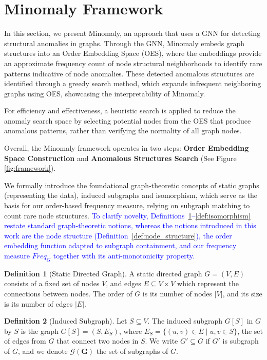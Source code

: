 \documentclass[preprint,12pt]{elsarticle}
\newcommand{\new}[1]{\textcolor{blue}{#1}}
\theoremstyle{plain}
\theoremstyle{definition}
\newtheorem{definition}{Definition}
\theoremstyle{remark}
\begin{document}
\section{Minomaly Framework}
\label{sec:framework}
In this section, we present Minomaly, an approach that uses a GNN for detecting structural anomalies in graphs. Through the GNN, Minomaly embeds graph structures into an Order Embedding Space (OES), where the embeddings provide an approximate frequency count of node structural neighborhoods to identify rare patterns indicative of node anomalies. These detected anomalous structures are identified through a greedy search method, which expands infrequent neighboring graphs using OES, showcasing the interpretability of Minomaly.

For efficiency and effectiveness, a heuristic search is applied to reduce the anomaly search space by selecting potential nodes from the OES that produce anomalous patterns, rather than verifying the normality of all graph nodes.

Overall, the Minomaly framework operates in two steps: \textbf{Order Embedding Space Construction} and \textbf{Anomalous Structures Search} (See Figure \ref{fig:framework}).

We formally introduce the foundational graph-theoretic concepts of static graphs (representing the data), induced subgraphs and isomorphism, which serve as the basis for our order-based frequency measure, relying on subgraph matching to count rare node structures. \new{To clarify novelty, Definitions~\ref{def:graph}--\ref{def:isomorphism} restate standard graph-theoretic notions, whereas the notions introduced in this work are the node structure (Definition~\ref{def:node_structure}), the order embedding function adapted to subgraph containment, and our frequency measure $Freq_G$ together with its anti-monotonicity property.}

\begin{definition}[Static Directed Graph]
A static directed graph $G = (V, E)$ consists of a fixed set of nodes $V$, and edges $E \subseteq V \times V$ which represent the connections between nodes.
The order of $G$ is its number of nodes $|V|$, and its size is its number of edges $|E|$.
\label{def:graph}
\end{definition}

\begin{definition}[Induced Subgraph]
Let $S \subseteq V$. The induced subgraph $G[S]$ in $G$ by $S$ is the graph $G[S] = (S, E_S)$, where $E_S = \{(u, v) \in E \mid u, v \in S\}$, the set of edges from $G$ that connect two nodes in $S$. We write $G' \subseteq G$ if $G'$ is subgraph of $G$, and we denote $\bm{\mathcal{G}(G)}$ the set of subgraphs of $G$.
\end{definition}
\end{document}

